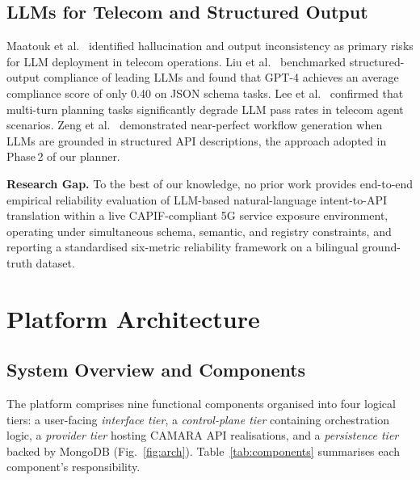\documentclass[conference]{IEEEtran}
\begin{document}
\subsection{LLMs for Telecom and Structured Output}

Maatouk et al.~\cite{maatouk2025} identified hallucination and output
inconsistency as primary risks for LLM deployment in telecom operations.
Liu et al.~\cite{liu2024} benchmarked structured-output compliance of
leading LLMs and found that GPT-4 achieves an average compliance score
of only 0.40 on JSON schema tasks.
Lee et al.~\cite{telagentbench2025} confirmed that multi-turn planning
tasks significantly degrade LLM pass rates in telecom agent scenarios.
Zeng et al.~\cite{flowmind2023} demonstrated near-perfect workflow
generation when LLMs are grounded in structured API descriptions,
the approach adopted in Phase\,2 of our planner.

\noindent\textbf{Research Gap.}
To the best of our knowledge, no prior work provides end-to-end empirical
reliability evaluation of LLM-based natural-language intent-to-API
translation within a live CAPIF-compliant 5G service exposure environment,
operating under simultaneous schema, semantic, and registry constraints,
and reporting a standardised six-metric reliability framework on a
bilingual ground-truth dataset.

\section{Platform Architecture}
\label{sec:arch}

\subsection{System Overview and Components}

The platform comprises nine functional components organised into four
logical tiers: a user-facing \emph{interface tier}, a
\emph{control-plane tier} containing orchestration logic, a
\emph{provider tier} hosting CAMARA API realisations, and a
\emph{persistence tier} backed by MongoDB (Fig.~\ref{fig:arch}).
Table~\ref{tab:components} summarises each component's responsibility.
\end{document}

